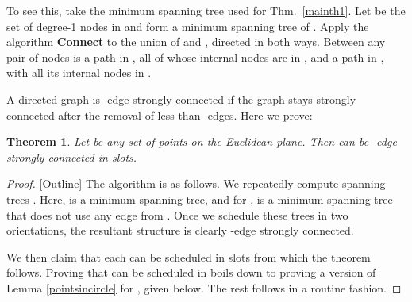 \documentclass[11pt]{amsart}
\newcounter{foo}
\newtheorem{theorem}[foo]{Theorem}
\begin{document}
To see this, take the minimum spanning tree  used for
Thm.~\ref{mainth1}. Let  be the set of degree-1 nodes in  and
form a minimum spanning tree  of . Apply the algorithm \textbf{Connect}
to the union of 
and , directed in both ways. Between any pair of nodes is a path in
, all of whose internal nodes are in , and a path in ,
with all its internal nodes in .

\iffalse To prove this, take the minimum spanning tree  used for
Thm.~\ref{mainth1}. Let  be its root, and let 
be the depth of  in  (when rooted at ). Let  and . Now we can schedule MSTs 
and  on each of them in  slots, each rooted at
. It is clear that if we remove any point  the union
of  still remains connected. However, 
itself is still an articulation point. To avoid this problem we can
orient  towards some other root, and perform the same process, thus
assuring that the removal of  is not problematic.
\fi

\smallskip

A directed graph is -edge strongly connected if the graph stays strongly connected after the removal of less than -edges.
Here we prove:
\begin{theorem}
Let  be any set of points on the Euclidean plane. Then  can be -edge strongly connected in 
slots.
\label{mainth2}
\end{theorem}
\begin{proof}{[Outline]}
The algorithm is as follows. We repeatedly compute  spanning trees
. Here,  is a minimum spanning tree, and
for ,  is a minimum spanning tree that does not use any
edge from . Once we schedule these trees in two
orientations, the resultant structure is clearly -edge strongly
connected.

We then claim that each  can be scheduled in 
slots from which the theorem follows. Proving that  can be
scheduled in  boils down to proving a version of Lemma
\ref{pointsincircle} for , 
given below.
The rest follows in a routine fashion.
\end{proof}
\end{document}
